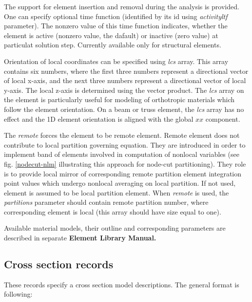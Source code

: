 \documentclass[a4paper]{article}
\newcommand{\param}[1]{{\em #1}}
\newcommand{\Pmode}[1]{{\sffamily #1}}
\begin{document}
The support for element insertion and removal during the analysis is provided. One can specify optional time function (identified by its id using \param{activityltf} parameter). The nonzero value of this time function indicates, whether the element is active (nonzero value, the dafault) or inactive (zero value) at particulat solution step. Currently available only for structural elements.

Orientation of local coordinates can be specified using \param{lcs} array. This array contains six numbers,
where the first three numbers represent a directional vector of local
x-axis, and the next three numbers represent a directional vector of local
y-axis. The local z-axis is determined using the vector product. The \param{lcs} array on the element is particularly useful for modeling of orthotropic materials which follow the element orientation. On a beam or truss element, the \param{lcs} array has no effect and the 1D element orientation is aligned with the global $xx$ component.

\Pmode{
The \param{remote} forces the element to be remote element. Remote
element does not contribute to local partition governing equation.
They are introduced in order to implement band of elements involved
in computation of nonlocal variables (see fig. \ref{nodecut-nlm} illustrating
this approach for node-cut partitioning). They role is to provide
local mirror of corresponding remote partition element integration point values which undergo
nonlocal averaging on local partition.
If not used, element is assumed to be local partition element.
When \param{remote} is used, the \param{partitions} parameter should
contain remote partition number, where
corresponding element is local (this array should have size equal to one).
}


Available material models, their outline and
corresponding parameters are described in separate {\bf Element Library Manual.}

\subsection{Cross section records}
\label{_CrossSectionRecords}
These records specify a cross section model descriptions. The general format is
following:
\end{document}
